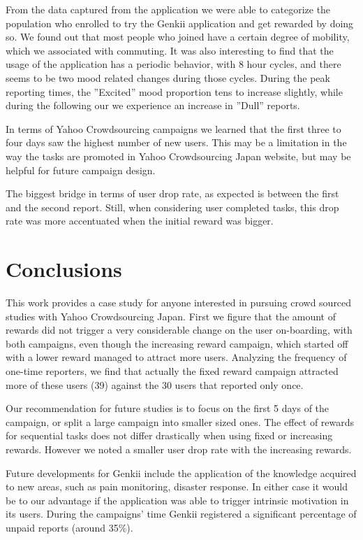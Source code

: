 \documentclass[letterpaper]{article}
\begin{document}
From the data captured from the application we were able to categorize the population who enrolled to try the Genkii application and get rewarded by doing so. We found out that most people who joined have a certain degree of mobility, which we associated with commuting. It was also interesting to find that the usage of the application has a periodic behavior, with 8 hour cycles, and there seems to be two mood related changes during those cycles. During the peak reporting times, the ''Excited'' mood proportion tens to increase slightly, while during the following our we experience an increase in ''Dull'' reports.  

In terms of Yahoo Crowdsourcing campaigns we learned that the first three to four days saw the highest number of new users. This may be a limitation in the way the tasks are  promoted in Yahoo Crowdsourcing Japan website, but may be helpful for future campaign design. 

The biggest bridge in terms of user drop rate, as expected is between the first and the second report. Still, when considering user completed tasks, this  drop rate was more accentuated when the initial reward was bigger.





 


\section{Conclusions}



This work provides a case study for anyone interested in pursuing crowd sourced studies with Yahoo Crowdsourcing Japan. First we figure that the amount of rewards did not trigger a very considerable change on the user on-boarding, with both campaigns, even though the increasing reward campaign, which started off with a lower reward managed to attract more users. Analyzing the frequency of one-time reporters, we find that actually the fixed reward campaign attracted more of these users (39) against the 30 users that reported only once.

Our recommendation for future studies is to focus on the first 5 days of the campaign, or split a large campaign into smaller sized ones. The effect of rewards for sequential tasks does not differ drastically when using fixed or increasing rewards. However we noted a smaller user drop rate with the increasing rewards. 

Future developments for Genkii include the application of the knowledge acquired to new areas, such as pain monitoring, disaster response. In either case it would be to our advantage if the application was able to trigger intrinsic motivation in its users.
During the campaigns' time Genkii registered a significant percentage of unpaid reports (around 35\%).  
\end{document}
